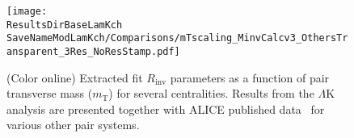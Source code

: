 \documentclass[ALICE,manyauthors]{cernphprep}
\newcommand{\ResultsDirBaseLamKch}{/home/jesse/Analysis/FemtoAnalysis/Results/Results_cLamcKch_20190319/}
\newcommand{\MomRes}{_MomResCrctn}%
\newcommand{\NonFlatBgdLamKch}{_NonFlatBgdCrctnLamK0LamKchPolynomial}
\newcommand{\ResNum}{_3Res}
\newcommand{\PrimMaxDecay}{_PrimMaxDecay10fm}
\newcommand{\ResMethod}{_UsingXiDataAndCoulombOnly}
\newcommand{\ParamFixAndShareLamKch}{_ShareLam_Dualie_ShareLam_ShareRadii}
\newcommand{\SaveNameModLamKch}{\MomRes\NonFlatBgdLamKch\ResNum\PrimMaxDecay\ResMethod\ParamFixAndShareLamKch}
\newcommand{\mt}{$m_{\mathrm{T}}$\xspace}
\newcommand{\LamK}{$\Lambda$K\xspace}
\providecommand{\DIFaddbeginFL}{} %
\providecommand{\DIFaddendFL}{} %
\providecommand{\DIFdelbeginFL}{} %
\providecommand{\DIFdelendFL}{} %
\begin{document}
\begin{figure}[h]
  \centering
  \DIFdelbeginFL %
\DIFdelendFL \DIFaddbeginFL \texttt{[image: \\ResultsDirBaseLamKch\\SaveNameModLamKch/Comparisons/mTscaling\_MinvCalcv3\_OthersTransparent\_3Res\_NoResStamp.pdf]}
  \DIFaddendFL \caption[\mt Scaling of Radii: 3 Residuals in Fit]
  {
  (Color online) Extracted fit $R_{\mathrm{inv}}$ parameters as a function of pair transverse mass (\mt) for several centralities.
  Results from the \LamK analysis are presented together with ALICE published data~\cite{Adam:2015vja} for various other pair systems.  
  }
  \label{fig:mTScalingOfRadii_3Res}
\end{figure}
\end{document}
